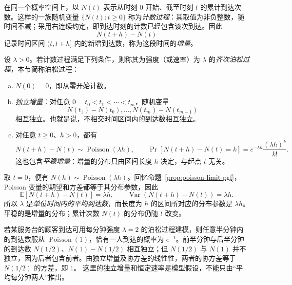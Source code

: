 \documentclass[lang=cn,a4paper,fontset=none,zihao=false,10pt,openany,twoside]{beautybook}
\numberwithin{algorithm}{chapter}
\begin{document}
\begin{definition}[泊松过程]\label{def:poisson-process}
在同一个概率空间上，以 $N(t)$ 表示从时刻 $0$ 开始、截至时刻 $t$ 的累计到达次数。这样的一族随机变量 $\{N(t):t\ge0\}$ 称为\emph{计数过程}：其取值为非负整数，随时间不减；采用右连续约定，即到达时刻的计数已经包含该次到达。因此
\[
 N(t+h)-N(t)
\]
记录时间区间 $(t,t+h]$ 内的新增到达数，称为这段时间的\emph{增量}。

设 $\lambda>0$。若计数过程满足下列条件，则称其为强度（或速率）为 $\lambda$ 的\emph{齐次泊松过程}，本节简称泊松过程：
\begin{enumerate}[(a)]
\item $N(0)=0$，即从零开始计数。
\item \emph{独立增量}：对任意 $0=t_0<t_1<\cdots<t_m$，随机变量
\[
 N(t_1)-N(t_0),\ldots,N(t_m)-N(t_{m-1})
\]
相互独立。也就是说，不相交时间区间内的到达数相互独立。
\item 对任意 $t\ge0$、$h>0$，都有
\[
 N(t+h)-N(t)\sim\operatorname{Poisson}(\lambda h),\qquad
 \Pr[N(t+h)-N(t)=k]=e^{-\lambda h}\frac{(\lambda h)^k}{k!}.
\]
这也包含\emph{平稳增量}：增量的分布只由区间长度 $h$ 决定，与起点 $t$ 无关。
\end{enumerate}
\end{definition}

取 $t=0$，便有 $N(h)\sim\operatorname{Poisson}(\lambda h)$。回忆命题~\ref{prop:poisson-limit-pgf}，Poisson 变量的期望和方差都等于其分布参数，因此
\[
 \mathbb E[N(t+h)-N(t)]=\lambda h,
 \qquad \operatorname{Var}(N(t+h)-N(t))=\lambda h.
\]
所以 $\lambda$ 是\emph{单位时间内的平均到达数}，而长度为 $h$ 的区间所对应的分布参数是 $\lambda h$。平稳的是增量的分布；累计次数 $N(t)$ 的分布仍随 $t$ 改变。

\begin{example}\label{ex:poisson-process-arrivals}
若某服务台的顾客到达可用每分钟强度 $\lambda=2$ 的泊松过程建模，则任意半分钟内的到达数服从 $\operatorname{Poisson}(1)$，恰有一人到达的概率为 $e^{-1}$。前半分钟与后半分钟的到达数 $N(1/2)$、$N(1)-N(1/2)$ 相互独立；但 $N(1/2)$ 与 $N(1)$ 并不独立，因为后者包含前者。由独立增量及协方差的线性性，两者的协方差等于 $N(1/2)$ 的方差，即 $1$。
这里的独立增量和恒定速率是模型假设，不能只由“平均每分钟两人”推出。
\end{example}
\end{document}
